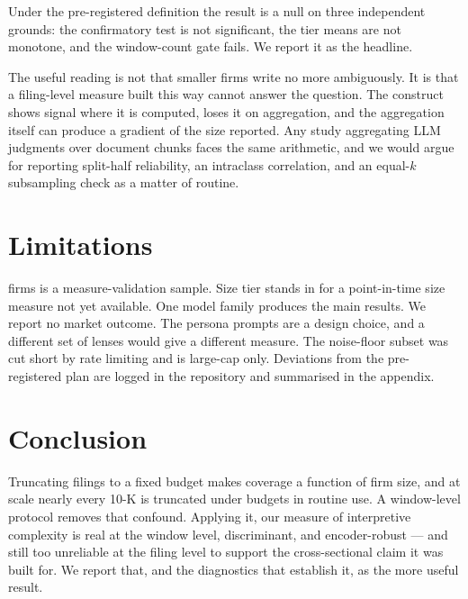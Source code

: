 \documentclass[sigconf,nonacm]{acmart}
\begin{document}
Under the pre-registered definition the result is a null on three independent
grounds: the confirmatory test is not significant, the tier means are not
monotone, and the window-count gate fails. We report it as the headline.

The useful reading is not that smaller firms write no more ambiguously. It is that
a filing-level measure built this way cannot answer the question. The construct
shows signal where it is computed, loses it on aggregation, and the aggregation
itself can produce a gradient of the size reported. Any study aggregating
LLM judgments over document chunks faces the same arithmetic, and we would argue
for reporting split-half reliability, an intraclass correlation, and an equal-$k$
subsampling check as a matter of routine.

\section{Limitations}

\NFirms{} firms is a measure-validation sample. Size tier stands in for a
point-in-time size measure not yet available. One model family produces the main
results. We report no market outcome. The persona prompts are a design choice, and
a different set of lenses would give a different measure. The noise-floor subset
was cut short by rate limiting and is large-cap only. Deviations from the
pre-registered plan are logged in the repository and summarised in the appendix.

\section{Conclusion}

Truncating filings to a fixed budget makes coverage a function of firm size, and
at scale nearly every 10-K is truncated under budgets in routine use. A
window-level protocol removes that confound. Applying it, our measure of
interpretive complexity is real at the window level, discriminant, and
encoder-robust --- and still too unreliable at the filing level to support the
cross-sectional claim it was built for. We report that, and the diagnostics that
establish it, as the more useful result.



\end{document}

